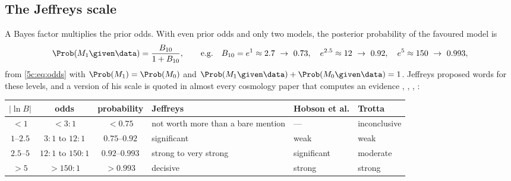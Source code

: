 \subsection{The Jeffreys scale}
\label{5c:sec:jeffreys}

A Bayes factor multiplies the prior odds. With even prior odds and only two models,
the posterior probability of the favoured model is
\begin{equation}
  \Prob(M_1\given\data)=\frac{B_{10}}{1+B_{10}},
  \qquad\text{e.g.}\quad
  B_{10}=e^{1}\approx2.7\ \to\ 0.73,\quad
  e^{2.5}\approx12\ \to\ 0.92,\quad
  e^{5}\approx150\ \to\ 0.993 ,
  \label{5c:eq:bf-prob}
\end{equation}
from \eqref{5c:eq:odds} with $\Prob(M_1)=\Prob(M_0)$ and $\Prob(M_1\given\data)+\Prob(M_0\given\data)=1$.
Jeffreys proposed words for these levels, and a version of his scale is quoted in
almost every cosmology paper that computes an evidence
, , \cite[Table~1]{Trotta2008},
\cite{KassRaftery1995}:

\begin{center}
\small
\renewcommand{\arraystretch}{1.15}
\begin{tabular}{@{}cccp{2.6cm}p{1.6cm}p{1.6cm}@{}}
\toprule
$\lvert\ln B\rvert$ & odds & probability & Jeffreys & Hobson et al. & Trotta \\\midrule
$<1$ & $<3:1$ & $<0.75$ & not worth more than a bare mention & --- & inconclusive\\
$1$--$2.5$ & $3:1$ to $12:1$ & $0.75$--$0.92$ & significant & weak & weak\\
$2.5$--$5$ & $12:1$ to $150:1$ & $0.92$--$0.993$ & strong to very strong & significant & moderate\\
$>5$ & $>150:1$ & $>0.993$ & decisive & strong & strong\\
\bottomrule
\end{tabular}
\end{center}

